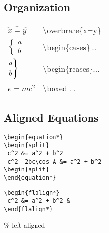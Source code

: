 \subsection*{Organization}
\begin{tabular}{l l}

$\overbrace{x=y}$ &  \textbackslash overbrace\{x=y\} \\
$\begin{cases} a \\ b \end{cases}$ & \textbackslash begin\{cases\}... \\
$\begin{rcases} a \\ b \end{rcases}$ & \textbackslash begin\{rcases\}... \\
$\boxed{e=mc^2}$ & \textbackslash boxed ... \\

\end{tabular}

\subsection*{Aligned Equations}
\begin{code}{5.5}
\begin{lstlisting}
\begin{equation*}
\begin{split}
 c^2 &= a^2 + b^2
 c^2 -2bc\cos A &= a^2 + b^2 
\begin{split}
\end{equation*}
\end{lstlisting}\end{code}

\begin{code}{3.8}
\begin{lstlisting}
\begin{flalign*} 
 c^2 &= a^2 + b^2 &
\end{flalign*}
\end{lstlisting}\end{code} \% left aligned

\ \\
